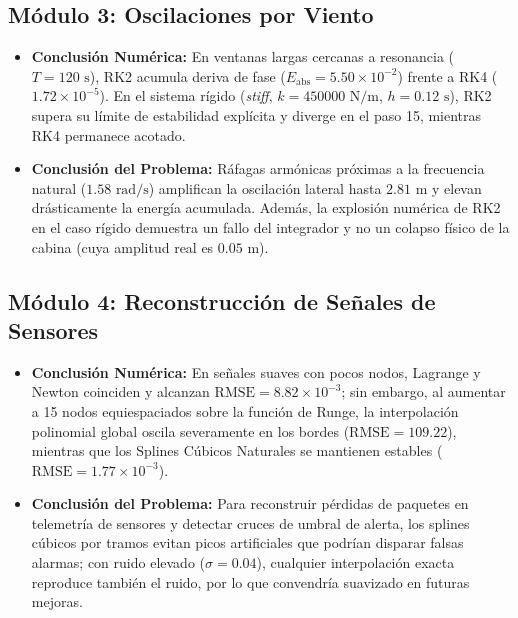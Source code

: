\documentclass[11pt,a4paper]{article}
\begin{document}
\subsection{Módulo 3: Oscilaciones por Viento}
\begin{itemize}
    \item \textbf{Conclusión Numérica:} En ventanas largas cercanas a resonancia ($T=120\text{ s}$), RK2 acumula deriva de fase ($E_{\text{abs}}=5.50\times 10^{-2}$) frente a RK4 ($1.72\times 10^{-5}$). En el sistema rígido (\textit{stiff}, $k=450000\text{ N/m}$, $h=0.12\text{ s}$), RK2 supera su límite de estabilidad explícita y diverge en el paso 15, mientras RK4 permanece acotado.
    \item \textbf{Conclusión del Problema:} Ráfagas armónicas próximas a la frecuencia natural ($1.58\text{ rad/s}$) amplifican la oscilación lateral hasta $2.81\text{ m}$ y elevan drásticamente la energía acumulada. Además, la explosión numérica de RK2 en el caso rígido demuestra un fallo del integrador y no un colapso físico de la cabina (cuya amplitud real es $0.05\text{ m}$).
\end{itemize}

\subsection{Módulo 4: Reconstrucción de Señales de Sensores}
\begin{itemize}
    \item \textbf{Conclusión Numérica:} En señales suaves con pocos nodos, Lagrange y Newton coinciden y alcanzan $\text{RMSE}=8.82\times 10^{-3}$; sin embargo, al aumentar a 15 nodos equiespaciados sobre la función de Runge, la interpolación polinomial global oscila severamente en los bordes ($\text{RMSE}=109.22$), mientras que los Splines Cúbicos Naturales se mantienen estables ($\text{RMSE}=1.77\times 10^{-3}$).
    \item \textbf{Conclusión del Problema:} Para reconstruir pérdidas de paquetes en telemetría de sensores y detectar cruces de umbral de alerta, los splines cúbicos por tramos evitan picos artificiales que podrían disparar falsas alarmas; con ruido elevado ($\sigma=0.04$), cualquier interpolación exacta reproduce también el ruido, por lo que convendría suavizado en futuras mejoras.
\end{itemize}

\end{document}
